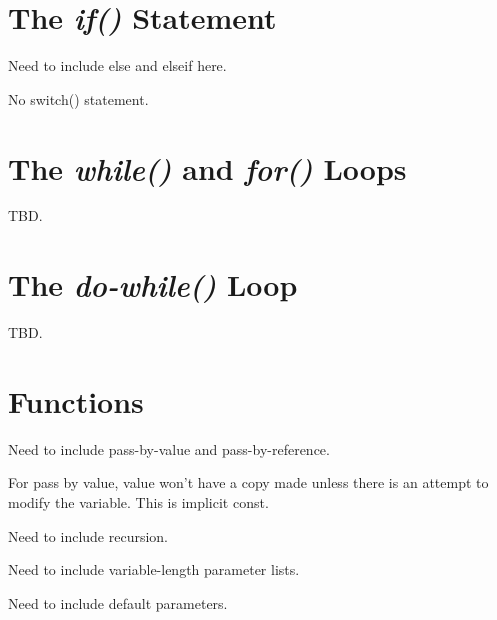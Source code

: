 \section{The \emph{if()} Statement}
\label{ccik2:sifs0}

Need to include else and elseif here.

No switch() statement.


\section{The \emph{while()} and \emph{for()} Loops}
\label{ccik2:swfl0}

TBD.


\section{The \emph{do-while()} Loop}
\label{ccik2:sdwl0}

TBD.


\section{Functions}
\label{ccik2:sfun0}

Need to include pass-by-value and pass-by-reference.

For pass by value, value won't have a copy made unless there is an attempt to modify the
variable.  This is implicit const.

Need to include recursion.

Need to include variable-length parameter lists.

Need to include default parameters.

